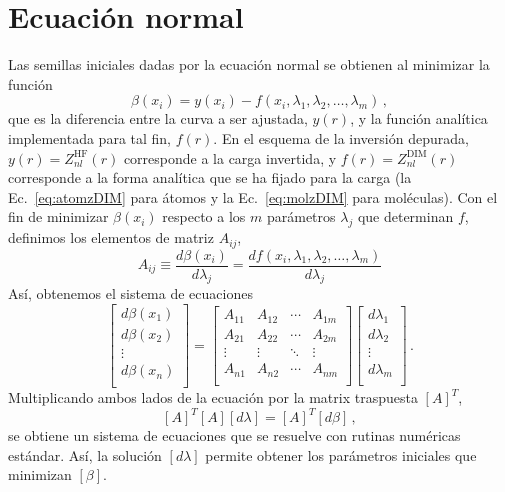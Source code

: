 \appendix

\chapter{Ecuación normal}
\label{app:ecnormal}

Las semillas iniciales dadas por la ecuación normal se obtienen al 
minimizar la función
\begin{equation}
 \beta(x_i) = y(x_i) - f(x_i,\lambda_1,\lambda_2,\dots,\lambda_m)\,,
\end{equation}
que es la diferencia entre la curva a ser ajustada, $y(r)$, y la función
analítica implementada para tal fin, $f(r)$. En el esquema de la inversión
depurada, $y(r) = Z_{nl}^{\mathrm{HF}}(r)$ corresponde a la carga invertida,
y $f(r) = Z_{nl}^{\mathrm{DIM}}(r)$ corresponde a la forma analítica que 
se ha fijado para la carga (la Ec.~\ref{eq:atomzDIM} para átomos y 
la Ec.~\ref{eq:molzDIM} para moléculas). Con el fin de minimizar
$\beta(x_i)$ respecto a los $m$ parámetros $\lambda_j$ que determinan 
$f$, definimos los elementos de matriz $A_{ij}$,
\begin{equation}
  A_{ij} \equiv \frac{d\beta(x_i)}{d\lambda_j} =
 \frac{df(x_i,\lambda_1,\lambda_2,\dots, \lambda_m)}{d\lambda_j}
\end{equation}
Así, obtenemos el sistema de ecuaciones
\begin{equation}
 \left[
 \begin{array}{c}
  d\beta(x_1) \\
  d\beta(x_2) \\
  \vdots \\
  d\beta(x_n) \\
 \end{array}
 \right] =
 \left[
 \begin{array}{cccc}
  A_{11} & A_{12} & \cdots & A_{1m} \\
  A_{21} & A_{22} & \cdots & A_{2m} \\
  \vdots & \vdots & \ddots & \vdots \\
  A_{n1} & A_{n2} & \cdots & A_{nm} \\
 \end{array}
 \right]
 \left[
 \begin{array}{c}
 d\lambda_1 \\
 d\lambda_2 \\
 \vdots \\
 d\lambda_m \\
 \end{array}
 \right] \,.
\end{equation}
Multiplicando ambos lados de la ecuación por la matrix traspuesta $[A]^{T}$,
\begin{equation}
  \left[ A \right]^T \left[ A \right]\left[ d\lambda \right] =
  \left[ A \right]^T \left[ d\beta \right]\,,
\end{equation}
se obtiene un sistema de ecuaciones que se resuelve con rutinas numéricas 
estándar. Así, la solución $[d\lambda]$ permite obtener los parámetros 
iniciales que minimizan $[\beta]$.

